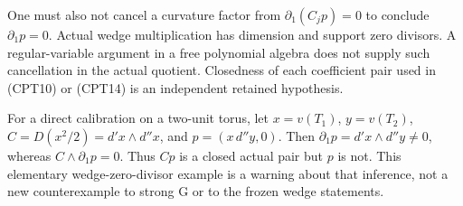 One must also not cancel a curvature factor from
$\partial_1(C_jp)=0$ to conclude $\partial_1p=0$.
Actual wedge multiplication has dimension and support zero
divisors.  A regular-variable argument in a free polynomial
algebra does not supply such cancellation in the actual
quotient.  Closedness of each coefficient pair used in
(CPT10) or (CPT14) is an independent retained hypothesis.

For a direct calibration on a two-unit torus, let
$x=v(T_1)$, $y=v(T_2)$,
$C=D(x^2/2)=d'x\wedge d''x$, and $p=(x\,d''y,0)$.
Then $\partial_1p=d'x\wedge d''y\ne0$, whereas
$C\wedge\partial_1p=0$.  Thus $Cp$ is a closed actual
pair but $p$ is not.  This elementary wedge-zero-divisor
example is a warning about that inference, not a new
counterexample to strong G or to the frozen wedge statements.
